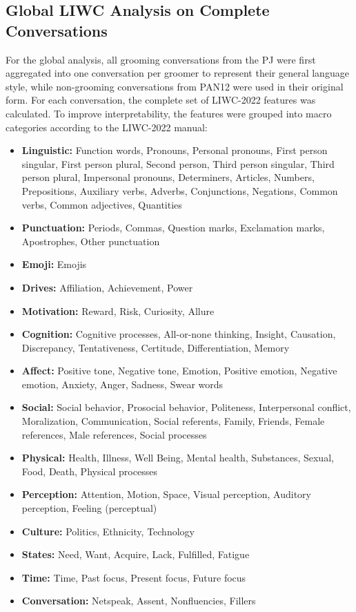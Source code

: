 \subsection{Global LIWC Analysis on Complete Conversations}

For the global analysis, all grooming conversations from the PJ were first aggregated into one conversation per groomer to represent their general language style, while non-grooming conversations from PAN12 were used in their original form. 
For each conversation, the complete set of LIWC-2022 features was calculated.  
To improve interpretability, the features were grouped into macro categories according to the LIWC-2022 manual:

\begin{itemize}
    \item \textbf{Linguistic:} Function words, Pronouns, Personal pronouns, First person singular, First person plural, Second person, Third person singular, Third person plural, Impersonal pronouns, Determiners, Articles, Numbers, Prepositions, Auxiliary verbs, Adverbs, Conjunctions, Negations, Common verbs, Common adjectives, Quantities
    \item \textbf{Punctuation:} Periods, Commas, Question marks, Exclamation marks, Apostrophes, Other punctuation
    \item \textbf{Emoji:} Emojis
    \item \textbf{Drives:} Affiliation, Achievement, Power
    \item \textbf{Motivation:} Reward, Risk, Curiosity, Allure
    \item \textbf{Cognition:} Cognitive processes, All-or-none thinking, Insight, Causation, Discrepancy, Tentativeness, Certitude, Differentiation, Memory
    \item \textbf{Affect:} Positive tone, Negative tone, Emotion, Positive emotion, Negative emotion, Anxiety, Anger, Sadness, Swear words
    \item \textbf{Social:} Social behavior, Prosocial behavior, Politeness, Interpersonal conflict, Moralization, Communication, Social referents, Family, Friends, Female references, Male references, Social processes
    \item \textbf{Physical:} Health, Illness, Well Being, Mental health, Substances, Sexual, Food, Death, Physical processes
    \item \textbf{Perception:} Attention, Motion, Space, Visual perception, Auditory perception, Feeling (perceptual)
    \item \textbf{Culture:} Politics, Ethnicity, Technology
    \item \textbf{States:} Need, Want, Acquire, Lack, Fulfilled, Fatigue
    \item \textbf{Time:} Time, Past focus, Present focus, Future focus
    \item \textbf{Conversation:} Netspeak, Assent, Nonfluencies, Fillers
\end{itemize}


